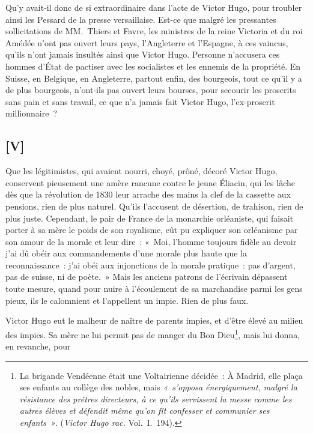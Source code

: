 \documentclass[french,twoside]{book} %
\begin{document}
Qu’y avait-il donc de si extraordinaire dans l’acte de Victor Hugo, pour troubler ainsi les Pessard de la presse versaillaise. Est-ce que malgré les pressantes sollicitations de MM. Thiers et Favre, les ministres de la reine Victoria et du roi Amédée n’ont pas ouvert leurs pays, l’Angleterre et l’Espagne, à ces vaincus, qu’ils n’ont jamais insultés ainsi que Victor Hugo. Personne n’accusera ces hommes d’État de pactiser avec les socialistes et les ennemis de la propriété. En Suisse, en Belgique, en Angleterre, partout enfin, des bourgeois, tout ce qu’il y a de plus bourgeois, n’ont-ils pas ouvert leurs bourses, pour secourir les proscrits sans pain et sans travail, ce que n’a jamais fait Victor Hugo, l’ex-proscrit millionnaire ?
\label{p47}\subsection[{[V]}]{[V]}
\noindent Que les légitimistes, qui avaient nourri, choyé, prôné, décoré Victor Hugo, conservent pieusement une amère rancune contre le jeune Éliacin, qui les lâche dès que la révolution de 1830 leur arrache des mains la clef de la cassette aux pensions, rien de plus naturel. Qu’ils l’accusent de désertion, de trahison, rien de plus juste. Cependant, le pair de France de la monarchie orléaniste, qui faisait porter à sa mère le poids de son royalisme, eût pu expliquer son orléanisme par son amour de la morale et leur dire : « Moi, l’homme toujours fidèle au devoir j’ai dû obéir aux commandements d’une morale plus haute que la reconnaissance : j’ai obéi aux injonctions de la morale pratique : pas d’argent, pas de suisse, ni de poète. » Mais les anciens patrons de l’écrivain dépassent toute mesure, quand pour nuire à l’écoulement de sa marchandise parmi les gens pieux, ils le calomnient et l’appellent un impie. Rien de plus faux.\par
Victor Hugo eut le malheur de naître de parents impies, et d’être élevé au milieu des impies. Sa mère ne lui permit pas de manger du Bon Dieu\footnote{La brigande Vendéenne était une Voltairienne décidée : À Madrid, elle plaça ses enfants au collège des nobles, mais \emph{« s’opposa énergiquement, malgré la résistance des prêtres directeurs, à ce qu’ils servissent la messe comme les autres élèves et défendit même qu’on fît confesser et communier ses enfants »}. (\emph{Victor Hugo rac.} Vol. I. 194).}, mais lui donna, en revanche, pour  
\end{document}

